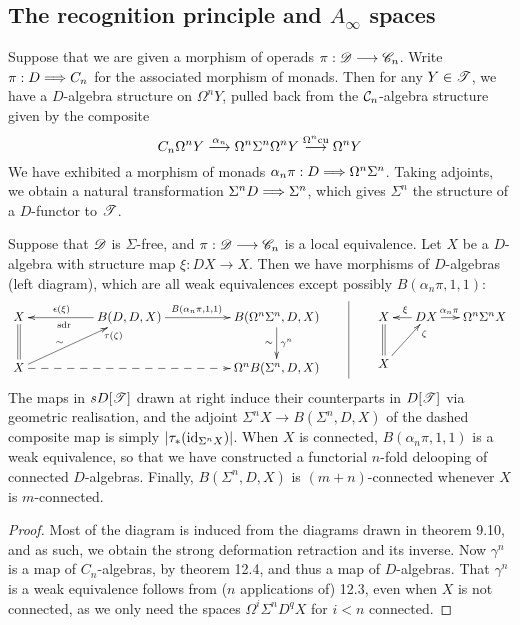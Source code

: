 \documentclass[11pt]{article}
\begin{document}
\begin{chapter13-15}
\setcounter{section}{12}
\section{The recognition principle and $A_\infty$ spaces}
Suppose that we are given a morphism of operads $\pi:\scrD\to\scrC_n$. Write $\pi:D\nt C_n$ for the associated morphism of monads. Then for any $Y\in\scrT$, we have a $D$-algebra structure on $\Omega^nY$, pulled back from the $\calC_n$-algebra structure given by the composite
\[C_n\Omega^nY\overset{\alpha_n}{\to}\Omega^n\Sigma^n\Omega^nY\overset{\Omega^n\textup{cu}}{\to}\Omega^nY\]
We have exhibited a morphism of monads $\alpha_n\pi:D\nt \Omega^n\Sigma^n$. Taking adjoints, we obtain a natural transformation $\Sigma^n D\nt \Sigma^n$, which gives $\Sigma^n$ the structure of a $D$-functor to $\scrT$.
\begin{thm*}[13.1]
Suppose that $\scrD$ is $\Sigma$-free, and $\pi:\scrD\to\scrC_n$ is a local equivalence. Let $X$ be a $D$-algebra with structure map $\xi:DX\to X$. Then we have morphisms of $D$-algebras (left diagram), which are all weak equivalences except possibly $B(\alpha_n\pi,1,1)$:
\[\xymatrix@C=1.8cm{
\ar@{=}[d]X&\ar[l]_{\epsilon(\xi)\qquad}^{\textup{sdr\qquad}}
B(D,D,X)\ar[r]^{B(\alpha_n\pi,1,1)\quad }
&B(\Omega^n\Sigma^n,D,X)\ar[d]^{\gamma^n}_\sim\\
X\ar[ur]_(.8){\tau(\zeta)}^(.4)\sim\ar@{-->}[rr]&%
&\Omega^nB(\Sigma^n,D,X)
}\qquad\vrule\qquad\xymatrix@C=.5cm{
X\ar@{=}[d]&\ar[l]_{\xi}DX\ar[r]^{\alpha_n\pi\quad }&\Omega^n\Sigma^nX\\
X\ar[ur]_(.8){\zeta}%
}\]
The maps in $sD[\scrT]$ drawn at right induce their counterparts in $D[\scrT]$ via geometric realisation, and the adjoint $\Sigma^nX\to B(\Sigma^n,D,X)$ of the dashed composite map is simply $|\tau_*(\id_{\Sigma^nX})|$. When $X$ is connected, $B(\alpha_n\pi,1,1)$ is a weak equivalence, so that we have constructed a functorial $n$-fold delooping of connected $D$-algebras. Finally, $B(\Sigma^n,D,X)$ is $(m+n)$-connected whenever $X$ is $m$-connected.
\end{thm*}
\begin{proof}
Most of the diagram is induced from the diagrams drawn in theorem 9.10, and as such,  we obtain the strong deformation retraction and its inverse. Now $\gamma^n$ is a map of $C_n$-algebras, by theorem 12.4, and thus a map of $D$-algebras. That $\gamma^n$ is a weak equivalence follows from ($n$ applications of) 12.3, even when $X$ is not connected, as we only need the spaces $\Omega^i\Sigma^nD^qX$ for $i<n$ connected.


\end{proof}
\end{chapter13-15}
\end{document}
